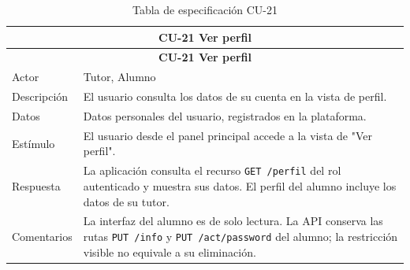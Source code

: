 \begin{longtable}{|p{4cm}|p{11cm}|}
\caption{Tabla de especificación CU-21}
\label{tab:cu21} \\

\hline
\multicolumn{2}{|c|}{\textbf{CU-21 Ver perfil}} \\
\hline
\endfirsthead

\hline
\multicolumn{2}{|c|}{\textbf{CU-21 Ver perfil}} \\
\hline
\endhead

\hline
\endfoot
\endlastfoot

Actor & Tutor, Alumno \\
\hline

Descripción & El usuario consulta los datos de su cuenta en la vista de perfil. \\
\hline

Datos & Datos personales del usuario, registrados en la plataforma. \\
\hline

Estímulo & El usuario desde el panel principal accede a la vista de "Ver perfil". \\
\hline

Respuesta & La aplicación consulta el recurso \texttt{GET /perfil} del rol autenticado y muestra sus datos. El perfil del alumno incluye los datos de su tutor. \\
\hline

Comentarios & La interfaz del alumno es de solo lectura. La API conserva las rutas \texttt{PUT /info} y \texttt{PUT /act/password} del alumno; la restricción visible no equivale a su eliminación. \\
\hline

\end{longtable}

